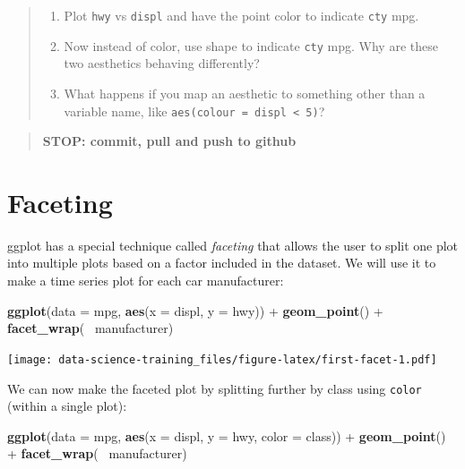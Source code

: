 \documentclass[]{book}
\newenvironment{Shaded}{\begin{snugshade}}{\end{snugshade}}
\newcommand{\KeywordTok}[1]{\textcolor[rgb]{0.13,0.29,0.53}{\textbf{{#1}}}}
\newcommand{\DataTypeTok}[1]{\textcolor[rgb]{0.13,0.29,0.53}{{#1}}}
\newcommand{\StringTok}[1]{\textcolor[rgb]{0.31,0.60,0.02}{{#1}}}
\newcommand{\NormalTok}[1]{{#1}}
\providecommand{\tightlist}{%
  \setlength{\itemsep}{0pt}\setlength{\parskip}{0pt}}
\theoremstyle{definition}
\theoremstyle{definition}
\theoremstyle{definition}
\theoremstyle{remark}
\begin{document}
\begin{quote}
\begin{enumerate}
\def\labelenumi{\arabic{enumi}.}
\setcounter{enumi}{1}
\tightlist
\item
  Plot \texttt{hwy} vs \texttt{displ} and have the point color to
  indicate \texttt{cty} mpg.
\item
  Now instead of color, use shape to indicate \texttt{cty} mpg. Why are
  these two aesthetics behaving differently?
\item
  What happens if you map an aesthetic to something other than a
  variable name, like \texttt{aes(colour\ =\ displ\ \textless{}\ 5)}?
\end{enumerate}
\end{quote}

\begin{quote}
\textbf{STOP: commit, pull and push to github}
\end{quote}

\section{Faceting}\label{faceting}

ggplot has a special technique called \emph{faceting} that allows the
user to split one plot into multiple plots based on a factor included in
the dataset. We will use it to make a time series plot for each car
manufacturer:

\begin{Shaded}
\begin{Highlighting}[]
\KeywordTok{ggplot}\NormalTok{(}\DataTypeTok{data =} \NormalTok{mpg, }\KeywordTok{aes}\NormalTok{(}\DataTypeTok{x =} \NormalTok{displ, }\DataTypeTok{y =} \NormalTok{hwy)) +}
\StringTok{    }\KeywordTok{geom_point}\NormalTok{() +}
\StringTok{    }\KeywordTok{facet_wrap}\NormalTok{(~}\StringTok{ }\NormalTok{manufacturer)}
\end{Highlighting}
\end{Shaded}

\texttt{[image: data-science-training\_files/figure-latex/first-facet-1.pdf]}

We can now make the faceted plot by splitting further by class using
\texttt{color} (within a single plot):

\begin{Shaded}
\begin{Highlighting}[]
 \KeywordTok{ggplot}\NormalTok{(}\DataTypeTok{data =} \NormalTok{mpg, }\KeywordTok{aes}\NormalTok{(}\DataTypeTok{x =} \NormalTok{displ, }\DataTypeTok{y =} \NormalTok{hwy, }\DataTypeTok{color =} \NormalTok{class)) +}
\StringTok{     }\KeywordTok{geom_point}\NormalTok{() +}
\StringTok{     }\KeywordTok{facet_wrap}\NormalTok{(~}\StringTok{ }\NormalTok{manufacturer)}
\end{Highlighting}
\end{Shaded}
\end{document}
